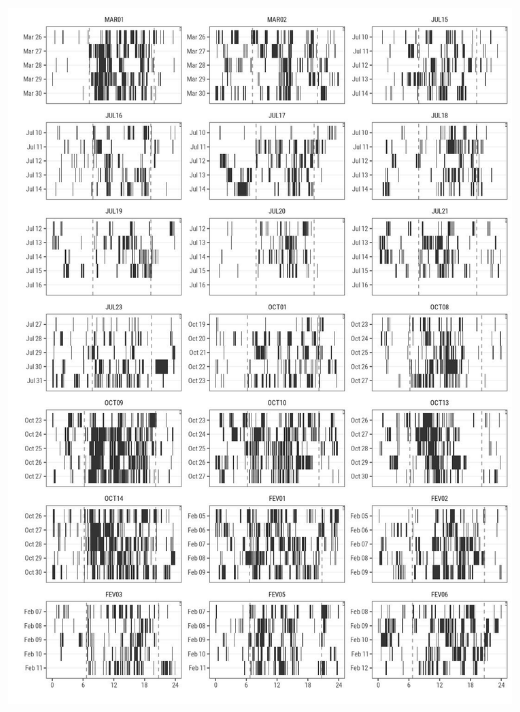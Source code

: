 \documentclass[english,msc,numbers,hidelinks]{coppe}
\begin{document}
  \begin{center}\includegraphics[width=1\linewidth]{../04_figures/actograms/actograms_high} \end{center}
\end{document}
